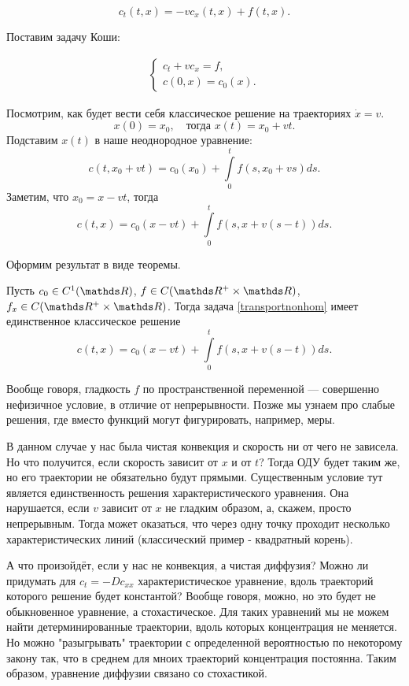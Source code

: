 $$ c_t (t, x) = - vc_x (t, x) + f(t, x). $$

Поставим задачу Коши:

\begin{align}
    \begin{cases} 
        c_t + v c_x = f, \\
        c (0, x) = c_0 (x).
    \end{cases}
\label{transportnonhom}
\end{align}

Посмотрим, как будет вести себя классическое решение на траекториях $ \dot x = v $.
\[
	x(0) = x_0,\quad \text{тогда } x(t) = x_0 + v t .
\]
Подставим $x(t)$ в наше неоднородное уравнение:
$$ c (t, x_0 + vt) = c_0 (x_0) + \int \limits_0^t f(s, x_0 + vs) ds. $$
Заметим, что $ x_0 = x - vt $, тогда
$$ c (t, x) = c_0 (x - vt) + \int \limits_0^t f(s, x + v(s-t)) ds. $$

Оформим результат  в виде теоремы.

\begin{theorem}
Пусть $c_0 \in C^1(\real)$, $f \in C (\real^+ \times \real)$, $f_x \in C (\real^+ \times \real)$. Тогда задача \eqref{transportnonhom} имеет единственное классическое решение $$ c (t, x) = c_0 (x - vt) + \int \limits_0^t f(s, x + v(s-t)) ds .$$
\end{theorem}

Вообще говоря, гладкость $f$ по пространственной переменной --- совершенно нефизичное условие, в отличие от непрерывности. Позже мы узнаем про слабые решения, где вместо функций могут фигурировать, например, меры.

В данном случае у нас была чистая конвекция и скорость ни от чего не зависела. Но что получится, если скорость зависит от $x$ и от $t$? Тогда ОДУ будет таким же, но его траектории не обязательно будут прямыми. Существенным условие тут является единственность решения характеристического уравнения. Она нарушается, если $v$ зависит от $x$ не гладким образом, а, скажем, просто непрерывным. Тогда может оказаться, что через одну точку проходит несколько характеристических линий (классический пример - квадратный корень).

{\small А что произойдёт, если у нас не конвекция, а чистая диффузия? Можно ли придумать для $c_t = -Dc_{xx}$ характеристическое уравнение, вдоль траекторий которого решение будет константой? Вообще говоря, можно, но это будет не обыкновенное уравнение, а стохастическое. Для таких уравнений мы не можем найти детерминированные траектории, вдоль которых концентрация не меняется. Но можно "разыгрывать" траектории с определенной вероятностью по некоторому закону так, что в среднем для мноих траекторий концентрация постоянна. Таким образом, уравнение диффузии связано со стохастикой.}









